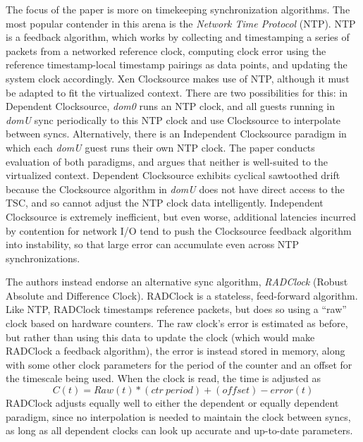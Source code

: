 \documentclass[10pt]{article}
\begin{document}
\begin{multicols*}{2}
The focus of the paper is more on timekeeping synchronization algorithms.
The most popular contender in this arena is the \emph{Network Time Protocol} (NTP).
NTP is a feedback algorithm, which works by collecting and timestamping a series
of packets from a networked reference clock, computing clock error using
the reference timestamp-local timestamp pairings as data points, 
and updating the system clock accordingly.  Xen Clocksource makes use of NTP,
although it must be adapted to fit the virtualized context.  There are two
possibilities for this:  in Dependent Clocksource, \emph{dom0} runs an NTP
clock, and all guests running in \emph{domU} sync periodically to this NTP
clock and use Clocksource to interpolate between syncs.  Alternatively, there
is an Independent Clocksource paradigm in which each \emph{domU} guest runs their own
NTP clock.  The paper conducts evaluation of both paradigms, and argues
that neither is well-suited to the virtualized context.  Dependent Clocksource
exhibits cyclical sawtoothed drift because the Clocksource algorithm in
\emph{domU} does not have direct access to the TSC, and so cannot adjust
the NTP clock data intelligently.  Independent Clocksource is extremely
inefficient, but even worse, additional latencies incurred by contention for
network I/O tend to push the Clocksource feedback algorithm into instability,
so that large error can accumulate even across NTP synchronizations.

The authors instead endorse an alternative sync algorithm, \emph{RADClock}
(Robust Absolute and Difference Clock).  RADClock is a stateless, feed-forward
algorithm.  Like NTP, RADClock timestamps reference packets, but does so using
a ``raw'' clock based on hardware counters.  The raw clock's error is estimated
as before, but rather than using this data to update the clock (which would make
RADClock a feedback algorithm), the error is instead stored in memory, along
with some other clock parameters for the period of the counter and an offset
for the timescale being used.  When the clock is read, the time is adjusted
as
\[
	C(t) = Raw(t) * (ctr~period) + (offset) - error(t)
\]
RADClock adjusts equally well to either the dependent or equally dependent paradigm,
since no interpolation is needed to maintain the clock between syncs, as long
as all dependent clocks can look up accurate and up-to-date parameters.


\end{multicols*}
\end{document}
